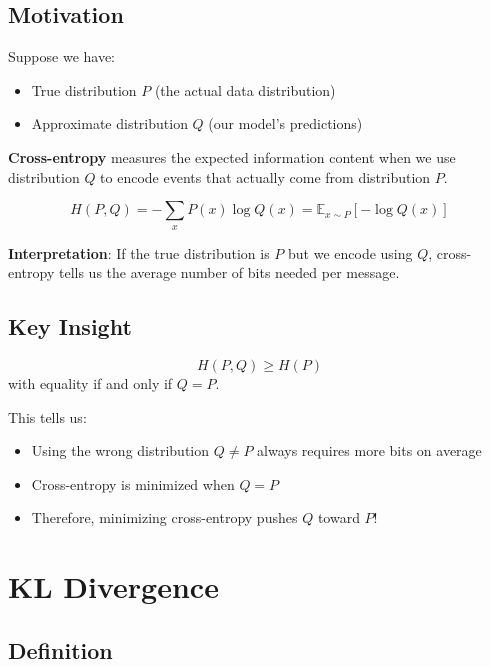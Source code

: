 \subsection{Motivation}

Suppose we have:
\begin{itemize}
    \item True distribution $P$ (the actual data distribution)
    \item Approximate distribution $Q$ (our model's predictions)
\end{itemize}

\textbf{Cross-entropy} measures the expected information content when we use distribution $Q$ to encode events that actually come from distribution $P$.

\begin{definition}
\[
\boxed{H(P, Q) = -\sum_{x} P(x) \log Q(x) = \mathbb{E}_{x \sim P}[-\log Q(x)]}
\]
\end{definition}

\textbf{Interpretation}: If the true distribution is $P$ but we encode using $Q$, cross-entropy tells us the average number of bits needed per message.

\subsection{Key Insight}

\begin{theorem}
\[
H(P, Q) \geq H(P)
\]
with equality if and only if $Q = P$.
\end{theorem}

This tells us:
\begin{itemize}
    \item Using the wrong distribution $Q \neq P$ always requires more bits on average
    \item Cross-entropy is minimized when $Q = P$
    \item Therefore, minimizing cross-entropy pushes $Q$ toward $P$!
\end{itemize}

\section{KL Divergence}

\subsection{Definition}

